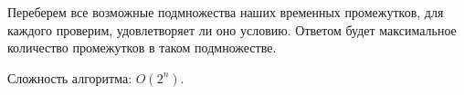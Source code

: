 \solutionSection

Переберем все возможные подмножества наших временных промежутков, для каждого проверим, удовлетворяет ли оно условию. Ответом будет максимальное количество промежутков в таком подмножестве.

Сложность алгоритма: $O(2^n)$.

\codeExample

